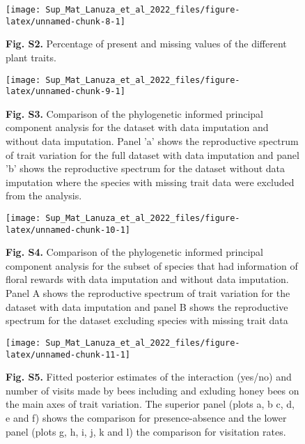 \documentclass[
  12pt,
]{article}
\begin{document}
\newpage

\begin{figure}[h]
\texttt{[image: Sup\_Mat\_Lanuza\_et\_al\_2022\_files/figure-latex/unnamed-chunk-8-1]} \caption{\textbf{Fig. S2.} Percentage of present and missing values of the different plant traits.}\label{fig:unnamed-chunk-8}
\end{figure}

\newpage

\begin{figure}[h]

{\centering \texttt{[image: Sup\_Mat\_Lanuza\_et\_al\_2022\_files/figure-latex/unnamed-chunk-9-1]} 

}

\caption{\textbf{Fig. S3.} Comparison of the phylogenetic informed principal component analysis for the dataset with data imputation and without data imputation. Panel 'a' shows the reproductive spectrum of trait variation for the full dataset with data imputation and panel 'b' shows the reproductive spectrum for the dataset without data imputation where the species with missing trait data were excluded from the analysis.}\label{fig:unnamed-chunk-9}
\end{figure}

\begin{figure}[h]

{\centering \texttt{[image: Sup\_Mat\_Lanuza\_et\_al\_2022\_files/figure-latex/unnamed-chunk-10-1]} 

}

\caption{\textbf{Fig. S4.} Comparison of the phylogenetic informed principal component analysis for the subset of species that had information of floral rewards with data imputation and without data imputation. Panel A shows the reproductive spectrum of trait variation for the dataset with data imputation and panel B shows the reproductive spectrum for the dataset excluding species with missing trait data}\label{fig:unnamed-chunk-10}
\end{figure}

\newpage

\begin{figure}[h]
\texttt{[image: Sup\_Mat\_Lanuza\_et\_al\_2022\_files/figure-latex/unnamed-chunk-11-1]} \caption{\textbf{Fig. S5.} Fitted posterior estimates of the interaction (yes/no) and number of visits made by bees including and exluding honey bees on the main axes of trait variation. The superior panel (plots a, b c, d, e and f) shows the comparison for presence-absence and the lower panel (plots g, h, i, j, k and l) the comparison for visitation rates.}\label{fig:unnamed-chunk-11}
\end{figure}
\end{document}
